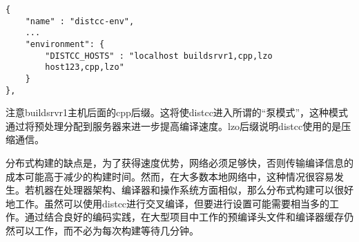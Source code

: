 \begin{lstlisting}[style=styleCMake]
{
	"name" : "distcc-env",
	...
	"environment": {
		"DISTCC_HOSTS" : "localhost buildsrvr1,cpp,lzo
		host123,cpp,lzo"
	}
},
\end{lstlisting}

注意buildsrvr1主机后面的cpp后缀。这将使distcc进入所谓的“泵模式”，这种模式通过将预处理分配到服务器来进一步提高编译速度。lzo后缀说明distcc使用的是压缩通信。

分布式构建的缺点是，为了获得速度优势，网络必须足够快，否则传输编译信息的成本可能高于减少的构建时间。然而，在大多数本地网络中，这种情况很容易发生。若机器在处理器架构、编译器和操作系统方面相似，那么分布式构建可以很好地工作。虽然可以使用distcc进行交叉编译，但要进行设置可能需要相当多的工作。通过结合良好的编码实践，在大型项目中工作的预编译头文件和编译器缓存仍然可以工作，而不必为每次构建等待几分钟。










